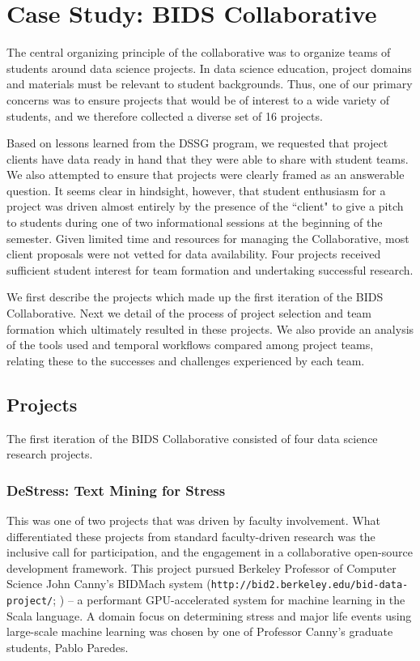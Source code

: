 \documentclass[12pt]{article}
\begin{document}
\section{Case Study: BIDS Collaborative}

The central organizing principle of the collaborative was to organize teams of students around data science projects. In data science education, project domains and materials must be relevant to student backgrounds. Thus, one of our primary concerns was to ensure projects that would be of interest to a wide variety of students, and we therefore collected a diverse set of 16 projects. 

Based on lessons learned from the DSSG program, we requested that project clients have data ready in hand that they were able to share with student teams. We also attempted to ensure that projects were clearly framed as an answerable question. It seems clear in hindsight, however, that student enthusiasm for a project was driven almost entirely by the presence of the ``client" to give a pitch to students during one of two informational sessions at the beginning of the semester. Given limited time and resources for managing the Collaborative, most client proposals were not vetted for data availability. Four projects received sufficient student interest for team formation and undertaking successful research.

We first describe the projects which made up the first iteration of the BIDS Collaborative.  Next we detail of the process of project selection and team formation which ultimately resulted in these projects.  We also provide an analysis of the tools used and temporal workflows compared among project teams, relating these to the successes and challenges experienced by each team.

\subsection{Projects}

The first iteration of the BIDS Collaborative consisted of four data science research projects.

\subsubsection*{DeStress: Text Mining for Stress}

This was one of two projects that was driven by faculty involvement. What differentiated these projects from standard faculty-driven research was the inclusive call for participation, and the engagement in a collaborative open-source development framework. This project pursued Berkeley Professor of Computer Science John Canny's BIDMach system (\texttt{http://bid2.berkeley.edu/bid-data-project/}; \cite{canny2013bidmach}) -- a performant GPU-accelerated system for machine learning in the Scala language. A domain focus on determining stress and major life events using large-scale machine learning was chosen by one of Professor Canny's graduate students, Pablo Paredes.
\end{document}
